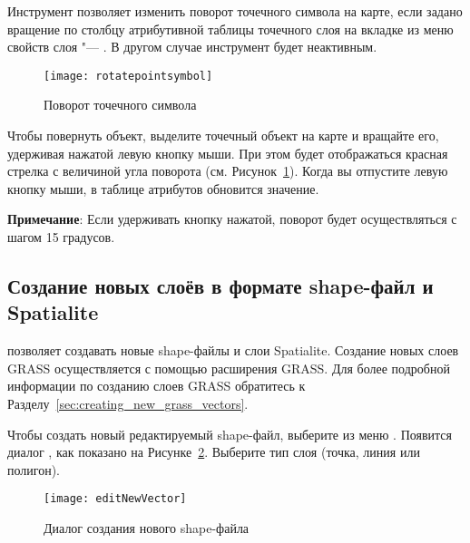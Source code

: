 
Инструмент  позволяет
изменить поворот точечного символа на карте, если задано вращение по столбцу
атрибутивной таблицы точечного слоя на вкладке  из меню
свойств слоя "--- . В другом случае инструмент будет
неактивным.

\begin{figure}[ht]
   \centering
   \texttt{[image: rotatepointsymbol]}
   \caption{Поворот точечного символа \wincaption}\label{fig:rotatepoint}
\end{figure}

Чтобы повернуть объект, выделите точечный объект на карте и вращайте его,
удерживая нажатой левую кнопку мыши. При этом будет отображаться красная
стрелка с величиной угла поворота (см. Рисунок~\ref{fig:rotatepoint}).
Когда вы отпустите левую кнопку мыши, в таблице атрибутов обновится значение.

\textbf{Примечание}: Если удерживать кнопку  нажатой, поворот
будет осуществляться с шагом 15 градусов.

\subsection{Создание новых слоёв в формате shape-файл и Spatialite}\label{sec:create shape}

\qg позволяет создавать новые shape-файлы и слои Spatialite. Создание новых
слоев GRASS осуществляется с помощью расширения GRASS. Для более подробной
информации по созданию слоев GRASS обратитесь к Разделу~\ref{sec:creating_new_grass_vectors}.

\label{sec:create shape}

Чтобы создать новый редактируемый shape-файл, выберите  \arrow
{} из меню
. Появится диалог , как показано
на Рисунке~\ref{fig:newvectorlayer}. Выберите тип слоя (точка, линия или полигон).

\begin{figure}[ht]
   \centering
   \texttt{[image: editNewVector]}
   \caption{Диалог создания нового shape-файла \wincaption}\label{fig:newvectorlayer}
\end{figure}

